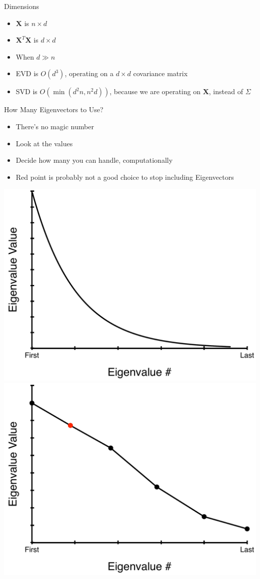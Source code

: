 \documentclass[aspectratio=169]{beamer}
\begin{document}
\begin{frame}{Dimensions}

\begin{itemize}
\item  $\textbf{X}$ is $n \times d$
\item $\textbf{X}^T\textbf{X}$ is $d \times d$
\item When $d \gg n$
\item EVD is $O(d^3)$, operating on a $d \times d$ covariance matrix
\item SVD is $O(\min(d^2n, n^2d))$, because we are operating on $\textbf{X}$, instead of  $\Sigma$
\end{itemize}
\end{frame}
\begin{frame}{How Many Eigenvectors to Use?}

\begin{itemize}
\item There's no magic number
\item Look at the values 
\item Decide how many you can handle, computationally
\item Red point is probably not a good choice to stop including Eigenvectors
\end{itemize}
\includegraphics[width=.4\textwidth]{lectDimRed/eigenValues1.pdf} \hspace{5em}
\includegraphics[width=.4\textwidth]{lectDimRed/eigenValues2.pdf}
\end{frame}
\end{document}
